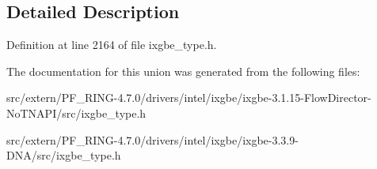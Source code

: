 

\subsection{Detailed Description}


Definition at line 2164 of file ixgbe\_\-type.h.



The documentation for this union was generated from the following files:\begin{DoxyCompactItemize}
\item 
src/extern/PF\_\-RING-\/4.7.0/drivers/intel/ixgbe/ixgbe-\/3.1.15-\/FlowDirector-\/NoTNAPI/src/ixgbe\_\-type.h\item 
src/extern/PF\_\-RING-\/4.7.0/drivers/intel/ixgbe/ixgbe-\/3.3.9-\/DNA/src/ixgbe\_\-type.h\end{DoxyCompactItemize}

